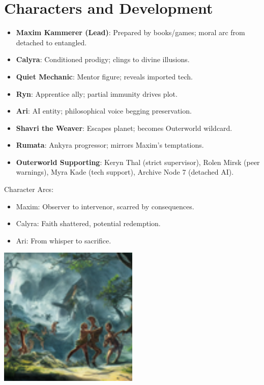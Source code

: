 \documentclass[10pt,letterpaper]{article}
\begin{document}
\section{Characters and Development}
\begin{itemize}
    \item \textbf{Maxim Kammerer (Lead)}: Prepared by books/games; moral arc from detached to entangled.
    \item \textbf{Calyra}: Conditioned prodigy; clings to divine illusions.
    \item \textbf{Quiet Mechanic}: Mentor figure; reveals imported tech.
    \item \textbf{Ryn}: Apprentice ally; partial immunity drives plot.
    \item \textbf{Ari}: AI entity; philosophical voice begging preservation.
    \item \textbf{Shavri the Weaver}: Escapes planet; becomes Outerworld wildcard.
    \item \textbf{Rumata}: Ankyra progressor; mirrors Maxim's temptations.
    \item \textbf{Outerworld Supporting}: Keryn Thal (strict supervisor), Rolen Mirsk (peer warnings), Myra Kade (tech support), Archive Node 7 (detached AI).
\end{itemize}

Character Arcs:
\begin{itemize}
    \item Maxim: Observer to intervenor, scarred by consequences.
    \item Calyra: Faith shattered, potential redemption.
    \item Ari: From whisper to sacrifice.
\end{itemize}

\begin{center}
\includegraphics[width=0.5\textwidth]{characters_image.jpg} %
{}
\end{center}
\end{document}
